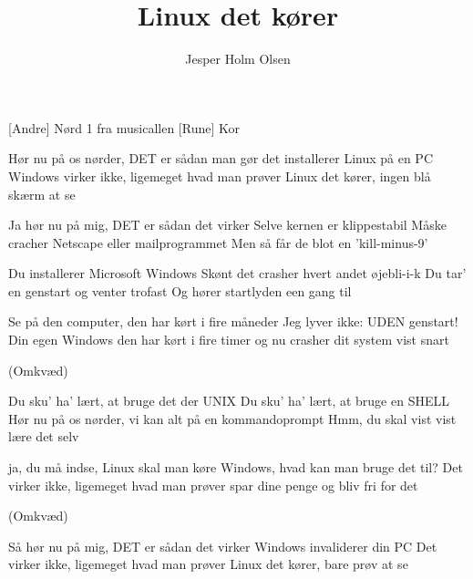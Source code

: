 \documentclass[danish]{article}
\title{Linux det kører}
\author{Jesper Holm Olsen}
\begin{document}
\maketitle

\begin{roles}
  [Andre] Nørd 1 fra musicallen
  [Rune] Kor
\end{roles}

\begin{song}

 Hør nu på os nørder, DET er sådan man gør det
installerer Linux på en PC
Windows virker ikke, ligemeget hvad man prøver
Linux det kører, ingen blå skærm at se

 Ja hør nu på mig, DET er sådan det virker
Selve kernen er klippestabil
Måske cracher Netscape eller mailprogrammet
Men så får de blot en 'kill-minus-9'

 Du installerer Microsoft Windows
Skønt det crasher hvert andet øjebli-i-k
Du tar' en genstart og venter trofast
Og hører startlyden een gang til

 Se på den computer, den har kørt i fire måneder
Jeg lyver ikke: UDEN genstart!
Din egen Windows den har kørt i fire timer
og nu crasher dit system vist snart

(Omkvæd)

 Du sku' ha' lært, at bruge det der UNIX
Du sku' ha' lært, at bruge en SHELL
Hør nu på os  nørder, vi kan alt på en kommandoprompt
Hmm, du skal vist vist lære det selv

 ja, du må indse, Linux skal man køre
Windows, hvad kan man bruge det til?
Det virker ikke, ligemeget hvad man prøver
spar dine penge og bliv fri for det

(Omkvæd)

 Så hør nu på mig, DET er sådan det virker
Windows invaliderer din PC
Det virker ikke, ligemeget hvad man prøver
Linux det kører, bare prøv at se

\end{song}
\end{document}
